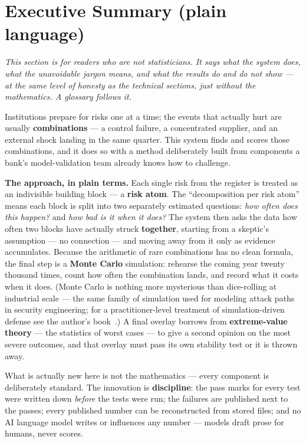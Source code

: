 \documentclass[11pt]{article}
\begin{document}
\section*{Executive Summary (plain language)}

\emph{This section is for readers who are not statisticians. It says what
the system does, what the unavoidable jargon means, and what the results do
and do not show --- at the same level of honesty as the technical sections,
just without the mathematics. A glossary follows it.}

Institutions prepare for risks one at a time; the events that actually hurt
are usually \textbf{combinations} --- a control failure, a concentrated
supplier, and an external shock landing in the same quarter. This system
finds and scores those combinations, and it does so with a method
deliberately built from components a bank's model-validation team already
knows how to challenge.

\textbf{The approach, in plain terms.} Each single risk from the register
is treated as an indivisible building block --- a \textbf{risk atom}. The
``decomposition per risk atom'' means each block is split into two
separately estimated questions: \emph{how often does this happen?} and
\emph{how bad is it when it does?} The system then asks the data how often
two blocks have actually struck \textbf{together}, starting from a
skeptic's assumption --- no connection --- and moving away from it only as
evidence accumulates. Because the arithmetic of rare combinations has no
clean formula, the final step is a \textbf{Monte Carlo} simulation:
rehearse the coming year twenty thousand times, count how often the
combination lands, and record what it costs when it does. (Monte Carlo is
nothing more mysterious than dice-rolling at industrial scale --- the same
family of simulation used for modeling attack paths in security
engineering; for a practitioner-level treatment of simulation-driven
defense see the author's book~\cite{cravino_book}.) A final overlay borrows
from \textbf{extreme-value theory} --- the statistics of worst cases --- to
give a second opinion on the most severe outcomes, and that overlay must
pass its own stability test or it is thrown away.

What is actually new here is not the mathematics --- every component is
deliberately standard. The innovation is \textbf{discipline}: the pass
marks for every test were written down \emph{before} the tests were run;
the failures are published next to the passes; every published number can
be reconstructed from stored files; and no AI language model writes or
influences any number --- models draft prose for humans, never scores.
\end{document}
